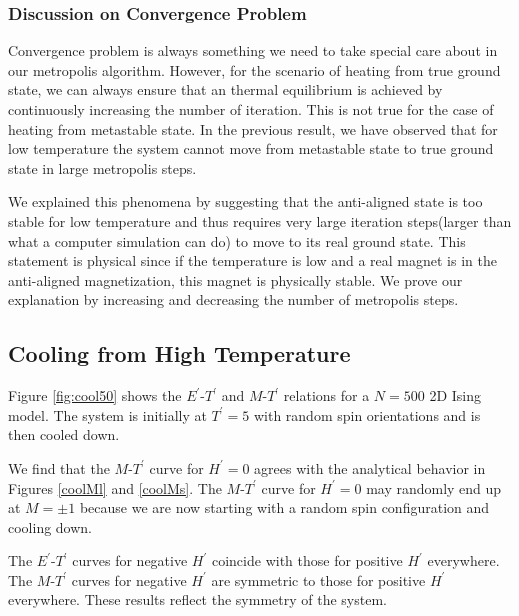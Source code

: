 \documentclass[11pt]{article}
\begin{document}
\subsubsection{Discussion on Convergence Problem}

Convergence problem is always something we need to take special care about in our metropolis algorithm. However, for the scenario of heating from true ground state, we can always ensure that an thermal equilibrium is achieved by continuously increasing the number of iteration. This is not true for the case of heating from metastable state. In the previous result, we have observed that for low temperature the system cannot move from metastable state to true ground state in large metropolis steps. 

We explained this phenomena by suggesting that the anti-aligned state is too stable for low temperature and thus requires very large iteration steps(larger than what a computer simulation can do) to move to its real ground state. This statement is physical since if the temperature is low and a real magnet is in the anti-aligned magnetization, this magnet is physically stable. We prove our explanation by increasing and decreasing the number of metropolis steps.

\subsection{Cooling from High Temperature}\label{cooling}

Figure \ref{fig:cool50} shows the $E^\prime$-$T^\prime$ and $M$-$T^\prime$ relations for a $N = 500$ 2D Ising model. The system is initially at $T^\prime = 5$ with random spin orientations and is then cooled down.

We find that the $M$-$T^\prime$ curve for $H^\prime = 0$ agrees with the analytical behavior in Figures \ref{coolMl} and \ref{coolMs}. The $M$-$T^\prime$ curve for $H^\prime = 0$ may randomly end up at $M = \pm 1$ because we are now starting with a random spin configuration and cooling down.

The $E^\prime$-$T^\prime$ curves for negative $H^\prime$ coincide with those for positive $H^\prime$ everywhere. The $M$-$T^\prime$ curves for negative $H^\prime$ are symmetric to those for positive $H^\prime$ everywhere. These results reflect the symmetry of the system.
\end{document}
